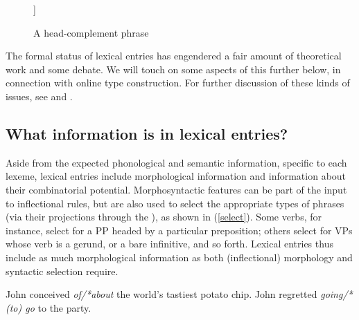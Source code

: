 \documentclass[output=paper
                ,modfonts
                ,nonflat
	        ,collection
	        ,collectionchapter
	        ,collectiontoclongg
 	        ,biblatex
                ,babelshorthands
                ,newtxmath
                ,draftmode
                ,colorlinks, citecolor=brown
]{./langsci/langscibook}
\begin{document}
{\begin{figure}
	\begin{forest}
	[ [{\avmtmp{[comps & < \1 >]}} ] 
	[{\avmtmp{[synsem & \1 ]}} ] ]
\end{forest}	
\caption{\label{expect-b-tree} A head-complement phrase}
\end{figure}


The formal status of lexical entries has engendered a fair amount of theoretical work and some debate.
We will touch on some aspects of this further below, in connection with online type construction.
For further discussion of these kinds of issues, see  and .

\subsection{What information is in lexical entries?}

Aside from the expected phonological and semantic information, specific to each lexeme, lexical entries include morphological information and information about their combinatorial potential. Morphosyntactic features can be part of the input to inflectional rules, but are also used to select the appropriate types of phrases (via their projections through the ), as shown in (\ref{select}). Some verbs, for instance, select for a PP headed by a particular preposition; others select for VPs whose verb is a gerund, or a bare infinitive, and so forth. Lexical entries thus include as much morphological information as both (inflectional) morphology and syntactic selection require.

\begin{exe}
	\ex\label{select}
	\begin{xlist}
		\ex\label{select-a}John conceived \emph{of/*about} the world's tastiest potato chip.
		\ex\label{select-b} John regretted \emph{going/*(to) go} to the party.
	\end{xlist}
\end{exe} 


}
\end{document}
